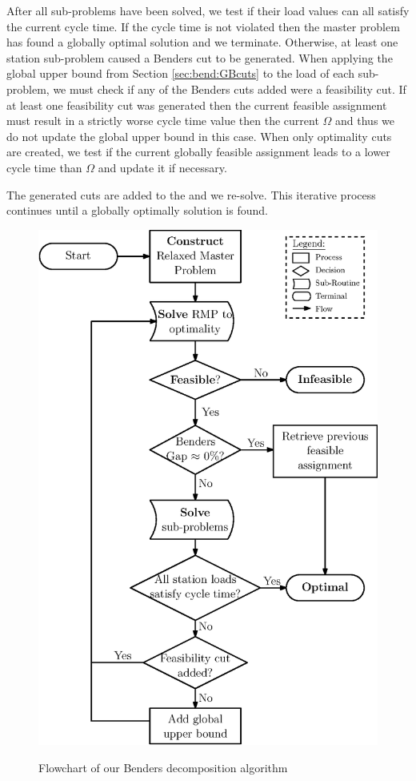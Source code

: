 After all sub-problems have been solved,
we test if their load values can all satisfy the current
cycle time.
If the cycle time is not violated then the master
problem has found a globally optimal solution
and we terminate.
Otherwise, at least one station sub-problem caused a Benders
cut to be generated.
When applying the global upper bound from Section \ref{sec:bend:GBcuts}
to the load of each sub-problem,
we must check if any of the Benders cuts added were a feasibility cut.
If at least one feasibility cut was generated then the current feasible assignment
must result in a strictly worse cycle time value then the current $\Omega$ and
thus we do not update the global upper bound in this case.
When only optimality cuts are created, we test
if the current globally feasible assignment leads to a lower
cycle time than $\Omega$ and update it if necessary.

The generated cuts are added to the \rmp{} and we re-solve.
This iterative process continues until a globally optimally solution is found.

\begin{figure}[tbp]
	\centering
	\caption{Flowchart of our Benders decomposition algorithm}
	\vspace{2mm}
	\includegraphics[height=0.95\textheight]{images/Benders-Optimality-Flowchart.eps}
	\label{fig:bend:RMPflowchart}
\end{figure}

